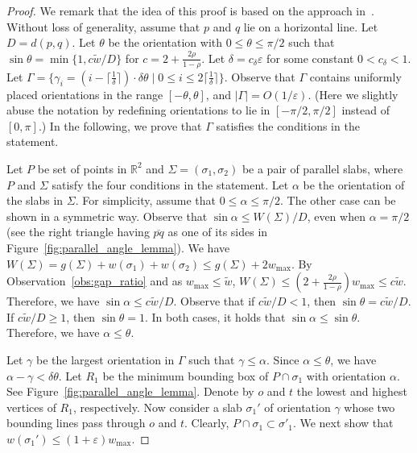 \documentclass[english,a4paper, cleveref, autoref, thm-restate, nolineno]{socg-lipics-v2021}
\theoremstyle{star}
\theoremstyle{claimstar}
\newcommand{\eps}{\ensuremath{\varepsilon}}
\begin{document}
\begin{proof}
    We remark that the idea of this proof is based on the approach in~\cite{agarwalTwo}.
    Without loss of generality, assume that $p$ and $q$ lie on a horizontal line. 
    Let $D = d(p, q)$. 
    Let $\theta$ be the orientation with $0\le \theta \le \pi/2$ such that $\sin\theta = \min \{1, c \widetilde w/{D} \}$ for $c= 2 + \frac{2\rho}{1-\rho}$.
    Let $\delta =  c_\delta \eps$ for some constant $0 < c_\delta < 1$. 
    Let $\Gamma = \{\gamma_i = (i- \lceil \frac{1}{\delta}\rceil)\cdot \delta\theta  \mid 0 \le i \le 2\lceil \frac{1}{\delta}\rceil \}$.
    Observe that $\Gamma$ contains uniformly placed orientations in the range $[-\theta, \theta]$, and $|\Gamma| = O(1/\eps)$. (Here we slightly abuse the notation by redefining orientations to lie in $[-\pi/2, \pi/2]$ instead of $[0, \pi]$.)
    In the following, we prove that $\Gamma$ satisfies the conditions in the statement.

    Let $P$ be set of points in $\mathbb R^2$ and $\Sigma = (\sigma_1, \sigma_2)$ be a pair of parallel slabs, where $P$ and $\Sigma$ satisfy the four conditions in the statement.
    Let $\alpha$ be the orientation of the slabs in $\Sigma$. 
    For simplicity, assume that $0\le \alpha \le \pi/2$. The other case can be shown in a symmetric way. 
    Observe that $\sin \alpha \le W(\Sigma)/D$, even when $\alpha = \pi/2$ (see the right triangle having $\overline{pq}$ as one of its sides in Figure~\ref{fig:parallel_angle_lemma}).
    We have $W(\Sigma) = g(\Sigma) + w(\sigma_1) + w(\sigma_2) \le g(\Sigma) + 2w_{\max} $. 
    By Observation~\ref{obs:gap_ratio} and as $w_{\max} \le \widetilde w$, $W(\Sigma) \le ( 2 + \frac{2\rho}{1-\rho} ) w_{\max}  \le c \widetilde w$.
    Therefore,
    we have $\sin \alpha \le c \widetilde w /D$.
    Observe that if $ c \widetilde w/ D < 1$, then $\sin \theta =  c \widetilde w/ D$. If $ c \widetilde w/ D \ge 1$, then $\sin \theta =1$. In both cases, it holds that $\sin \alpha \le \sin \theta$. Therefore, we have $\alpha \le \theta$. 
    

     Let $\gamma$ be the largest orientation in $\Gamma$ such that $\gamma \le \alpha$. 
     Since $ \alpha \le  \theta$, we have $\alpha - \gamma < \delta \theta$. 
     Let $R_1$ be the minimum bounding box of $P \cap \sigma_1$ with orientation $\alpha$. See Figure~\ref{fig:parallel_angle_lemma}.
     Denote by $o$ and $t$ the lowest and highest vertices of $R_1$, respectively. 
    Now consider a slab $\sigma_1'$ of orientation $\gamma$ whose two bounding lines pass through $o$ and $t$. 
    Clearly, $P\cap \sigma_1 \subset \sigma'_1$. 
    We next show that $w(\sigma_1') \le (1+\eps)w_{\max}$.


\end{proof}
\end{document}
